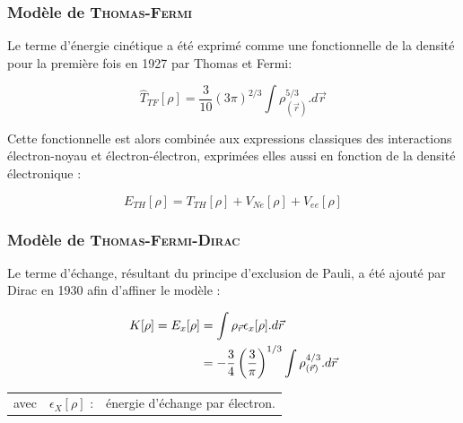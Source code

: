 	\subsubsection{Modèle de \textsc{Thomas-Fermi}}
	
	Le terme d'énergie cinétique a été exprimé comme une fonctionnelle de la densité pour la première fois en 1927 par Thomas et Fermi:
	
	\begin{equation}
	\hat{T}_{TF}[\rho] = \frac{3}{10} (3\pi)^{2/3} \int \rho_{(\vec{r})}^{5/3} .d\vec{r}
	\label{ener_cin_thom_ferm}
	\end{equation}
	
	Cette fonctionnelle est alors combinée aux expressions classiques des interactions électron-noyau et électron-électron, exprimées elles aussi en fonction de la densité électronique :
	
	\begin{equation}
	E_{TH}[\rho] = T_{TH}[\rho] + V_{Ne}[\rho] + V_{ee}[\rho]
	\end{equation}
	
	\subsubsection{Modèle de \textsc{Thomas-Fermi-Dirac}}
	
	Le terme d'échange, résultant du principe d'exclusion de Pauli, a été ajouté par Dirac en 1930 afin d'affiner le modèle :
	
	\begin{align}
	K[\rho] = E_{x}[\rho] &= \int \rho_{\vec{r}} \epsilon_{x}[\rho] .d\vec{r} \\
	&= -\frac{3}{4} \left(\frac{3}{\pi}\right)^{1/3} \int \rho_{(\vec{r})}^{4/3} .d\vec{r} \notag
	\end{align}
	
	\begin{flushleft}
		\begin{tabular}{@{}lrp{10cm}}
			avec & $\epsilon_{X}[\rho]$ : & énergie d'échange par électron. 
		\end{tabular}
	\end{flushleft}
	
